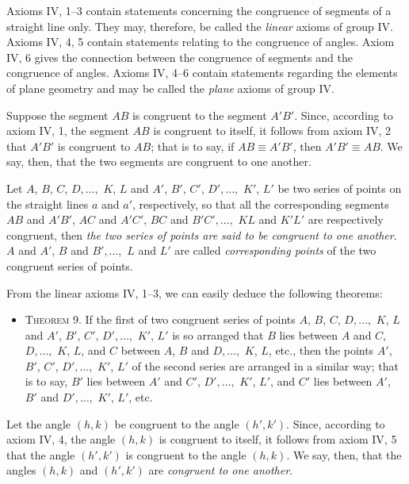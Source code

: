\documentclass[11pt,oneside]{book}
\begin{document}
Axioms IV, 1--3 contain statements concerning the
congruence of segments of a straight line only. They
may, therefore, be called the \emph{linear} axioms of group
IV\@. Axioms IV, 4, 5 contain statements relating to
the congruence of angles. Axiom IV, 6 gives the connection
between the congruence of segments and the
congruence of angles. Axioms IV, 4--6 contain statements
regarding the elements of plane geometry and
may be called the \emph{plane} axioms of group IV.

\label{p7}

Suppose the segment $AB$ is congruent to the segment
$A'B'$. Since, according to axiom IV, 1, the segment
$AB$ is congruent to itself, it follows from axiom
IV, 2 that $A'B'$ is congruent to $AB$; that is to say, if
$AB \equiv A'B'$, then $A'B' \equiv AB$. We say, then, that the
two segments are congruent to one another.

Let $A$, $B$, $C$, $D,\ldots,$ $K$, $L$ and $A'$, $B'$, $C'$, $D',\ldots,$
$K'$, $L'$ be two series of points on the straight lines $a$
and $a'$, respectively, so that all the corresponding segments
$AB$ and $A'B'$, $AC$ and $A'C'$, $BC$ and $B'C',\ldots,$
$KL$ and $K'L'$ are respectively congruent, then \emph{the two
series of points are said to be congruent to one another}.
$A$ and $A'$, $B$ and $B',\ldots,$ $L$ and $L'$ are called \emph{corresponding
points} of the two congruent series of points.

From the linear axioms IV, 1--3, we can easily deduce
the following theorems:

\begin{itemize}
\item[]{\scshape Theorem 9.} If the first of two congruent series
of points $A$, $B$, $C$, $D,\ldots,$ $K$, $L$ and $A'$, $B'$,
$C'$, $D',\ldots,$ $K'$, $L'$ is so arranged that $B$ lies
between $A$ and $C$, $D,\ldots,$ $K$, $L$, and $C$ between
$A$, $B$ and $D,\ldots,$ $K$, $L$, etc., then the points $A'$,
$B'$, $C'$, $D',\ldots,$ $K'$, $L'$ of the second series are
arranged in a similar way; that is to say, $B'$
lies between $A'$ and $C'$, $D',\ldots,$ $K'$, $L'$, and $C'$
lies between $A'$, $B'$ and $D',\ldots,$ $K'$, $L'$, etc.
\end{itemize}

Let the angle $(h,k)$ be congruent to the angle
$(h',k')$. Since, according to axiom IV, 4, the angle
$(h,k)$ is congruent to itself, it follows from axiom IV,
5 that the angle $(h',k')$ is congruent to the angle
$(h,k)$. We say, then, that the angles $(h,k)$ and $(h',k')$
are \emph{congruent to one another}.
\end{document}
